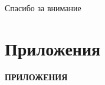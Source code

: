 \documentclass[c, dvipsnames]{beamer}  %
\begin{document}
\begin{frame}[c, plain]
\begin{center}

{\LARGE Спасибо за внимание}

\bigskip

{\Large \inserttitle}

\bigskip

{\insertauthor} 

\bigskip

\bigskip\bigskip

{\large \insertdate}
\end{center}
\end{frame}

\section{Приложения}
\begin{frame}[plain,c]
\begin{center}
\Huge{\textbf{
	ПРИЛОЖЕНИЯ}}
\end{center}
	
\end{frame}
\end{document}
